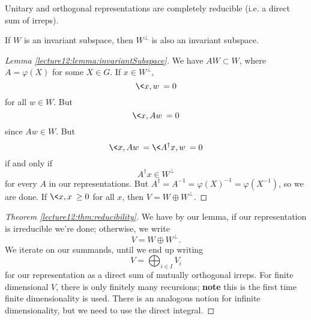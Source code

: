 \begin{thm}\label{lecture12:thm:reducibility}
Unitary and orthogonal representations are completely reducible
(i.e. a direct sum of irreps).
\end{thm}
\begin{lem}\label{lecture12:lemma:invariantSubspace}
If $W$ is an invariant subspace, then $W^{\bot}$ is also an
invariant subspace.
\end{lem}
\begin{proof}[Lemma \ref{lecture12:lemma:invariantSubspace}]
We have $AW\subset W$, where $A=\varphi(X)$ for some $X\in G$. If
$x\in W^{\bot}$,
\begin{equation}
\<x,w\>=0
\end{equation}
for all $w\in W$. But 
\begin{equation}
\<x,Aw\>=0
\end{equation}
since $Aw\in W$. But
\begin{equation}
\<x,Aw\>=\<A^{\dagger}x,w\>=0
\end{equation}
if and only if
\begin{equation}
A^{\dagger}x\in W^{\bot}
\end{equation}
for every $A$ in our representations. But
$A^{\dagger}=A^{-1}=\varphi(X)^{-1}=\varphi(X^{-1})$, so we are
done. If $\<x,x\>\geq0$ for all $x$, then $V=W\oplus W^{\bot}$.
\end{proof}
\begin{proof}[Theorem \ref{lecture12:thm:reducibility}]
We have by our lemma, if our representation is irreducible we're
done; otherwise, we write
\begin{equation}
V=W\oplus W^{\bot}.
\end{equation}
We iterate on our summands, until we end up writing
\begin{equation}
V = \bigoplus_{i\in I}V_{i}
\end{equation}
for our representation as a direct sum of mutually orthogonal
irreps. For finite dimensional $V$, there is only finitely many
recursions; \textbf{note} this is the first time finite
dimensionality is used. There is an analogous notion for infinite
dimensionality, but we need to use the direct integral.
\end{proof}

